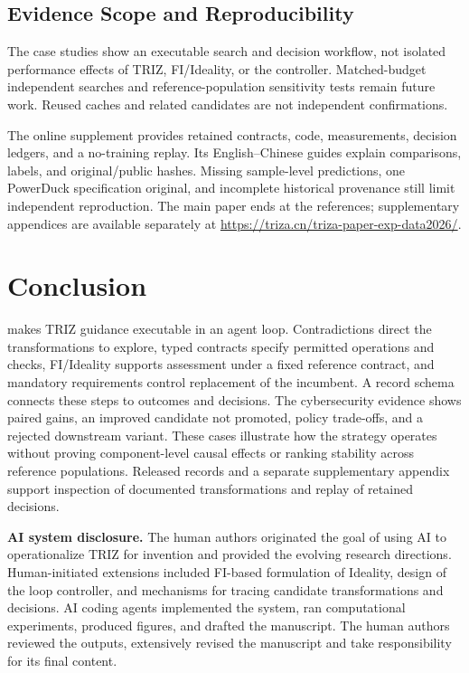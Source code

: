 \documentclass[sigconf]{acmart}
\begin{document}
\subsection{Evidence Scope and Reproducibility}
\label{sec:evidence-scope}
\label{sec:reproducibility-main}

The case studies show an executable search and decision workflow, not
isolated performance effects of TRIZ, FI/Ideality, or the controller.
Matched-budget independent searches and reference-population sensitivity
tests remain future work. Reused caches and related candidates are not
independent confirmations.

The online supplement provides retained contracts, code, measurements,
decision ledgers, and a no-training replay. Its English--Chinese guides
explain comparisons, labels, and original/public hashes. Missing
sample-level predictions, one PowerDuck specification original, and
incomplete historical provenance still limit independent reproduction.
The main paper ends at the references; supplementary appendices are
available separately at \url{https://triza.cn/triza-paper-exp-data2026/}.

\section{Conclusion}
\label{sec:conclusion}

\triza{} makes TRIZ guidance executable in an agent loop. Contradictions
direct the transformations to explore, typed contracts specify permitted
operations and checks, FI/Ideality supports assessment under a fixed
reference contract, and mandatory requirements control replacement of the
incumbent. A record schema connects these steps to outcomes and decisions.
The cybersecurity evidence shows paired gains, an improved candidate not
promoted, policy trade-offs, and a rejected downstream variant. These
cases illustrate how the strategy operates without proving component-level
causal effects or ranking stability across reference populations.
Released records and a separate supplementary appendix support inspection
of documented transformations and replay of retained decisions.

\noindent\textbf{AI system disclosure.} The human authors originated the goal of using AI to operationalize TRIZ for invention and provided the evolving research directions. Human-initiated
extensions included FI-based formulation of Ideality, design of the loop controller, and mechanisms for tracing candidate transformations and decisions. AI coding agents implemented the system, ran computational experiments, produced figures, and drafted the manuscript. The human authors reviewed the outputs, extensively revised the manuscript and take responsibility for its final content.


\clearpage
\balance


\end{document}
